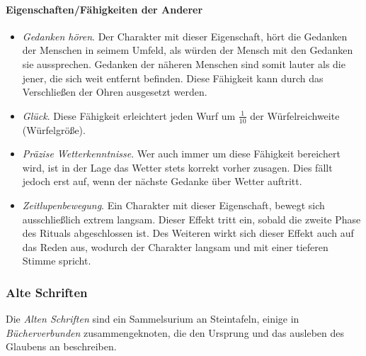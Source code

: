         \paragraph{Eigenschaften/Fähigkeiten der Anderer}
            \begin{itemize}
                \item \emph{Gedanken hören}. Der Charakter mit dieser Eigenschaft, hört die Gedanken der Menschen in seimem Umfeld, als würden der Mensch mit den Gedanken sie aussprechen. Gedanken der näheren Menschen sind somit lauter als die jener, die sich weit entfernt befinden. Diese Fähigkeit kann durch das Verschließen der Ohren ausgesetzt werden.
                \item \emph{Glück}. Diese Fähigkeit erleichtert jeden Wurf um $\frac{1}{10}$ der Würfelreichweite (Würfelgröße).
                \item \emph{Präzise Wetterkenntnisse}. Wer auch immer um diese Fähigkeit bereichert wird, ist in der Lage das Wetter stets korrekt vorher zusagen. Dies fällt jedoch erst auf, wenn der nächste Gedanke über Wetter auftritt.
                \item \emph{Zeitlupenbewegung}. Ein Charakter mit dieser Eigenschaft, bewegt sich ausschließlich extrem langsam. Dieser Effekt tritt ein, sobald die zweite Phase des Rituals abgeschlossen ist. Des Weiteren wirkt sich dieser Effekt auch auf das Reden aus, wodurch der Charakter langsam und mit einer tieferen Stimme spricht.
            \end{itemize}

    \subsubsection{Alte Schriften}
        \label{sons:kult-von-colthubor:alte-schriften}
        Die \emph{Alten Schriften} sind ein Sammelsurium an Steintafeln, einige in \emph{Bücherverbunden} zusammengeknoten, die den Ursprung und das ausleben des Glaubens an  beschreiben.

